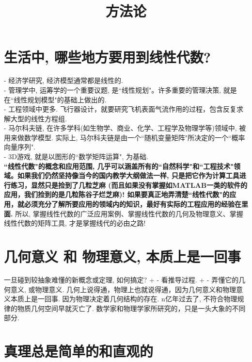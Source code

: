 \documentclass[UTF8]{ctexart}
\title{方法论}
\begin{document}
\tableofcontents %
\date{} %
\maketitle  %



\section{生活中, 哪些地方要用到线性代数?}

- 经济学研究, 经济模型通常都是线性的. \\
- 管理学中, 运筹学的一个重要议题, 是``线性规划"。许多重要的管理决策, 就是在``线性规划模型"的基础上做出的. \\
- 工程领域中更多. 飞行器设计，就要研究飞机表面气流作用的过程，包含反复求解大型的线性方程组.\\
- 马尔科夫链, 在许多学科(如生物学、商业、化学、工程学及物理学等)领域中, 被用来做数学模型. 实际上, 马尔科夫链是由一个``随机变量矩阵"所决定的一个``概率向量序列". \\
- 3D游戏, 就是以图形的``数学矩阵运算", 为基础. \\

\textbf{``线性代数"的概念和应用范围, 几乎可以涵盖所有的``自然科学"和``工程技术"领域。如果我们仍然坚持像当今的国内教学大纲做法一样, 只是把它作为计算工具进行练习，显然只是捡到了几粒芝麻 (而且如果没有掌握如MATLAB一类的软件的应用，我们捡到的是几粒陈谷子烂芝麻)! 如果要真正地弄清楚``线性代数"的应用，就必须充分了解所要应用的领域内的知识，最好有实际的工程应用的经验在里面.} 所以, 掌握线性代数的广泛应用案例、掌握线性代数的几何及物理意义、掌握线性代数的矩阵工具, 才是掌握线代的必由之路! \\




\section{几何意义 和 物理意义, 本质上是一回事}

一旦碰到较抽象难懂的新概念或定理, 如何搞定? +
- 看推导过程. +
- 弄懂它的几何意义, 或物理意义. 几何上说得通，物理上也就说得通，因为几何意义和物理意义本质上是一回事. 因为物理决定着几何结构的存在. n亿年过去了, 不符合物理规律的物质几何空间早就灭亡了. 数学家和物理学家所研究的，只是一头大象的不同部分. 


\section{真理总是简单的和直观的}
\end{document}
